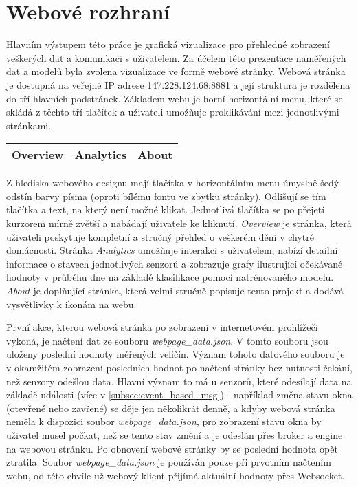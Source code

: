 \chapter{Webové rozhraní} \label{chap:web_page}

Hlavním výstupem této práce je grafická vizualizace pro přehledné zobrazení veškerých dat a komunikaci s uživatelem. Za účelem této prezentace naměřených dat a modelů byla zvolena vizualizace ve formě webové stránky. Webová stránka je dostupná na veřejné IP adrese 147.228.124.68:8881 a její struktura je rozdělena do tří hlavních podstránek. Základem webu je horní horizontální menu, které se skládá z těchto tří tlačítek a uživateli umožňuje proklikávání mezi jednotlivými stránkami.

\begin{table}[h!]
\centering
\begin{tabular}{|P{2.5cm}|P{2.5cm}|P{2.5cm}|} 
 \hline
 Overview & Analytics & About \\
 \hline
\end{tabular}
\end{table}

Z hlediska webového designu mají tlačítka v horizontálním menu úmyslně šedý odstín barvy písma (oproti bílému fontu ve zbytku stránky). Odlišují se tím tlačítka a text, na který není možné klikat. Jednotlivá tlačítka se po přejetí kurzorem mírně zvětší a nabádají uživatele ke kliknutí. \textit{Overview} je stránka, která uživateli poskytuje kompletní a stručný přehled o veškerém dění v chytré domácnosti. Stránka \textit{Analytics} umožňuje interakci s uživatelem, nabízí detailní informace o stavech jednotlivých senzorů a zobrazuje grafy ilustrující očekávané hodnoty v průběhu dne na základě klasifikace pomocí natrénovaného modelu. \textit{About} je doplňující stránka, která velmi stručně popisuje tento projekt a dodává vysvětlivky k ikonám na webu. \par
První akce, kterou webová stránka po zobrazení v internetovém prohlížeči vykoná, je načtení dat ze souboru \textit{webpage\_data.json}. V tomto souboru jsou uloženy poslední hodnoty měřených veličin. Význam tohoto datového souboru je v okamžitém zobrazení posledních hodnot po načtení stránky bez nutnosti čekání, než senzory odešlou data. Hlavní význam to má u senzorů, které odesílají data na základě události (více v \cref{subsec:event_based_msg}) - například změna stavu okna (otevřené nebo zavřené) se děje jen několikrát denně, a kdyby webová stránka neměla k dispozici soubor \textit{webpage\_data.json}, pro zobrazení stavu okna by uživatel musel počkat, než se tento stav změní a je odeslán přes broker a engine na webovou stránku. Po obnovení webové stránky by se poslední hodnota opět ztratila. Soubor \textit{webpage\_data.json} je používán pouze při prvotním načtením webu, od této chvíle už webový klient přijímá aktuální hodnoty přes Websocket.  


